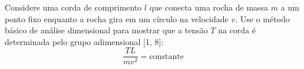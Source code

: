 Considere uma corda de comprimento $l$ que conecta uma rocha de massa $m$ a um ponto fixo enquanto a rocha gira em um círculo na velocidade $v$. Use o método básico de análise dimensional para mostrar que a tensão $T$ na corda é determinada pelo grupo adimensional [1, 8]:
\begin{equation}
    \frac{TL}{m v^2} = \text{constante}
\end{equation}
